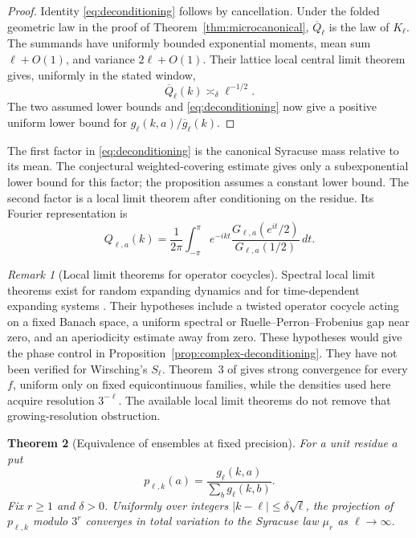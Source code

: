\documentclass[11pt]{article}
\newtheorem{theorem}{Theorem}[section]
\theoremstyle{remark}
\newtheorem{remark}[theorem]{Remark}
\begin{document}
\begin{proof}
Identity \eqref{eq:deconditioning} follows by cancellation. Under the
folded geometric law in the proof of Theorem~\ref{thm:microcanonical},
$\overline Q_\ell$ is the law of $K_\ell$.
The summands have uniformly bounded exponential moments,
mean sum $\ell+O(1)$, and variance $2\ell+O(1)$. Their lattice local
central limit theorem gives, uniformly in the stated window,
\[
 \overline Q_\ell(k)\asymp_\delta\ell^{-1/2}.
\]
The two assumed lower bounds and \eqref{eq:deconditioning} now give a
positive uniform lower bound for
$g_\ell(k,a)/\overline g_\ell(k)$.
\end{proof}

The first factor in \eqref{eq:deconditioning} is the canonical Syracuse
mass relative to its mean. The conjectural weighted-covering estimate
gives only a subexponential lower bound for this factor; the
proposition assumes a constant lower bound. The second factor is a
local limit theorem after conditioning on the residue. Its Fourier
representation is
\[
 Q_{\ell,a}(k)=\frac{1}{2\pi}\int_{-\pi}^{\pi}
 e^{-ikt}\frac{G_{\ell,a}(e^{it}/2)}{G_{\ell,a}(1/2)}\,dt.
\]

\begin{remark}[Local limit theorems for operator cocycles]
Spectral local limit theorems exist for random expanding dynamics
\cite{DragicevicEtAl2018} and for time-dependent expanding systems
\cite{Hafouta2020}. Their hypotheses include a twisted operator
cocycle acting on a fixed Banach space, a uniform spectral or
Ruelle--Perron--Frobenius gap near zero, and an aperiodicity estimate
away from zero. These hypotheses would give the phase control in
Proposition~\ref{prop:complex-deconditioning}. They have not been
verified for Wirsching's $S_\ell$. Theorem~3 of
\cite{Wirsching2003} gives strong convergence for every $f$, uniform
only on fixed equicontinuous families, while the densities used here
acquire resolution $3^{-\ell}$. The available local limit theorems do
not remove that growing-resolution obstruction.
\end{remark}

\begin{theorem}[Equivalence of ensembles at fixed precision]
\label{thm:fixed-precision-ensemble}
For a unit residue $a$ put
\[
 p_{\ell,k}(a)=\frac{g_\ell(k,a)}{\sum_b g_\ell(k,b)}.
\]
Fix $r\ge1$ and $\delta>0$. Uniformly over integers
$|k-\ell|\le\delta\sqrt\ell$, the projection of $p_{\ell,k}$ modulo
$3^r$ converges in total variation to the Syracuse law $\mu_r$ as
$\ell\to\infty$.
\end{theorem}
\end{document}
